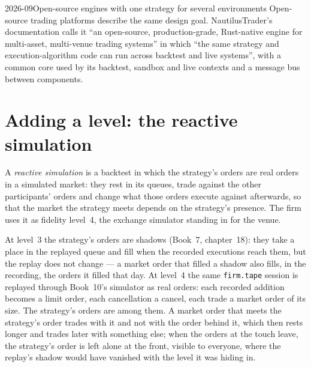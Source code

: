 \label{lst:pl:backtest-engine-architecture:save}

\begin{dated}{2026-09}{Open-source engines with one strategy for several environments}\label{dat:pl:backtest-engine-architecture:oss}
Open-source trading platforms describe the same design goal. NautilusTrader's documentation calls it ``an open-source,
production-grade, Rust-native engine for multi-asset, multi-venue trading systems'' in which ``the same strategy and execution-algorithm
code can run across backtest and live systems'', with a common core used by its backtest, sandbox and live contexts and a message bus
between components.
\end{dated}

\section{Adding a level: the reactive simulation}

\begin{definition}\label{def:pl:backtest-engine-architecture:reactive}
A \emph{reactive simulation} is a backtest in which the strategy's orders are real orders in a simulated
market: they rest in its queues, trade against the other participants' orders and change what those orders execute against afterwards,
so that the market the strategy meets depends on the strategy's presence. The firm uses it as fidelity level~4, the exchange simulator
standing in for the venue.
\end{definition}

At level~3 the strategy's orders are shadows (Book~7, chapter~18): they take a place in the replayed queue and fill when the recorded
executions reach them, but the replay does not change --- a market order that filled a shadow also fills, in the recording, the orders
it filled that day. At level~4 the same \texttt{firm.tape} session is replayed through Book~10's simulator as real orders: each recorded
addition becomes a limit order, each cancellation a cancel, each trade a market order of its size. The strategy's orders are among them.
A market order that meets the strategy's order trades with it and not with the order behind it, which then rests longer and trades later
with something else; when the orders at the touch leave, the strategy's order is left alone at the front, visible to everyone, where the
replay's shadow would have vanished with the level it was hiding in.

